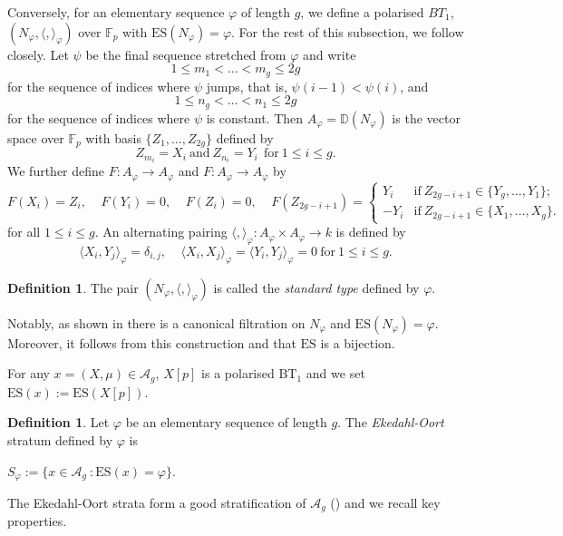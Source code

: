 \documentclass[11pt,table]{amsart}
\numberwithin{equation}{section}
\theoremstyle{definition}
\newtheorem{defn}[thm]{Definition}
\theoremstyle{remark}
\theoremstyle{remark}
\begin{document}
Conversely, for an elementary sequence $ \varphi$ of length $g$, we define a polarised $BT_1$, $(N_{\varphi}, \langle, \rangle_{\varphi})$ over $\mathbb{F}_p$ with $\text{ES}(N_{\varphi}) = \varphi$. For the rest of this subsection, we follow \cite[Section 9]{oort2001stratification} closely. Let $\psi$  be the final sequence stretched from $\varphi$ and write 
$$ 1 \le m_1 < \ldots  < m_g \le 2g $$
for the sequence of indices where $\psi$ jumps, that is, $\psi (i -1 ) < \psi (i)$, and 
$$ 1 \le n_g < \ldots < n_1 \le 2g$$
for the sequence of indices where $\psi$ is constant. Then $A_{\varphi} = \mathbb{D}(N_{\varphi})$ is the vector space over $\mathbb{F}_p$ with basis $\{ Z_1, \ldots, Z_{2g} \}$ defined by 
$$Z_{m_i} = X_i  \ \text{and} \ Z_{n_i} = Y_i \ \ \text{for} \ 1 \le i \le g.$$
We further define $ F: A_{\varphi} \rightarrow A_{\varphi}$ and $F : A_{\varphi} \rightarrow A_{\varphi}$ by 
$$ F(X_i) = Z_i, \; \; \; \; F(Y_i) =0, \; \; \; \; F(Z_i) =0, \; \; \; \; F(Z_{2g - i +1}) = \begin{cases}
        Y_i &  \text{if} \ Z_{2g - i + 1} \in \{ Y_g, \ldots, Y_1 \}; \\  
        - Y_i  & \text{if} \ Z_{2g - i + 1} \in \{ X_1, \ldots, X_g \} .
     \end{cases}$$
for all $ 1 \le i \le g$. An alternating pairing $\langle, \rangle_\varphi{} : A_{\varphi} \times A_{\varphi} \rightarrow k$ is defined by
$$ \langle X_i, Y_j \rangle_{\varphi} = \delta_{i,j}, \; \; \; \;  \langle X_i, X_j \rangle_{\varphi} = \langle Y_i, Y_j \rangle_{\varphi} =0 \ \text{for} \ 1 \le i \le g.$$ 
\begin{defn} \label{def: N_varphi}
 The pair $(N_{\varphi}, \langle, \rangle_{\varphi})$ is called the \textit{standard type} defined by $\varphi$.
\end{defn}
Notably, as shown in \cite[Section 9.1]{oort2001stratification} there is a canonical filtration on $N_{\varphi}$ and $\text{ES}(N_{\varphi}) = \varphi$. Moreover, it follows from this construction and \cite[Theorem 9.4]{oort2001stratification} that  $\text{ES}$ is a bijection.


For any $ x = (X, \mu) \in \mathcal{A}_{g}$, $X[p]$ is a polarised $\text{BT}_{1}$ and we set $ \text{ES}(x) := \text{ES}(X[p])$.
\begin{defn}
 Let $\varphi$ be an elementary sequence of length $g$. The \textit{Ekedahl-Oort} stratum defined by $\varphi$ is
 \begin{center}
     $S_{\varphi} := \{ x \in \mathcal{A}_{g} \ : 
     \text{ES}(x) = \varphi \}$.
 \end{center}
\end{defn}
The Ekedahl-Oort strata form a good stratification of $\mathcal{A}_{g}$ (\cite[Theorem 1.3]{oort2001stratification}) and we recall key properties.  
\end{document}
